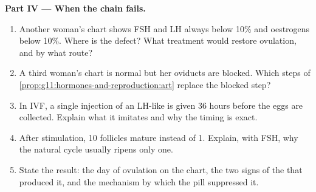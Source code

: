 \begin{problem}
\medskip
\noindent\textbf{Part IV --- When the chain fails.}
\begin{enumerate}[resume]
  \item Another woman's chart shows FSH and LH always below 10\% and
        oestrogens below 10\%. Where is the defect? What treatment
        would restore ovulation, and by what route?
  \item A third woman's chart is normal but her oviducts are blocked.
        Which steps of \cref{prop:g11:hormones-and-reproduction:art}
        replace the blocked step?
  \item In IVF, a single injection of an LH-like  is given 36
        hours before the eggs are collected. Explain what it imitates
        and why the timing is exact.
  \item After stimulation, 10 follicles mature instead of 1. Explain,
        with FSH, why the natural cycle usually ripens only one.
  \item State the result: the day of ovulation on the chart, the two
        signs of the  that produced it, and the mechanism by
        which the pill suppressed it.
\end{enumerate}
\end{problem}
